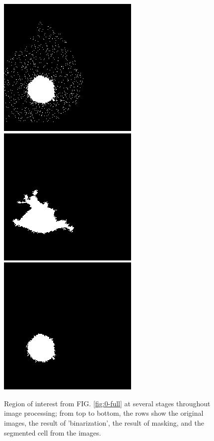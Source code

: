 \documentclass[ twocolumn,notitlepage]{ revtex4-1}
\begin{document}
\begin{center}
\begin{figure}[h!]
\includegraphics[width=.3\textwidth]{img/2-last.png}\\
\includegraphics[width=.3\textwidth]{img/3-first.png}
\includegraphics[width=.3\textwidth]{img/3-last.png}\\
\caption{\label{fig:0123}Region of interest from FIG. \ref{fig:0-full} at several stages throughout image processing; from top to bottom, the rows show the original images, the result of 'binarization', the result of masking, and the segmented cell from the images.}
\end{figure}



\end{center}
\end{document}
